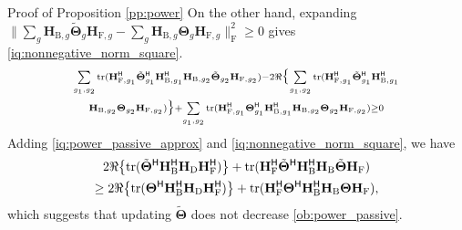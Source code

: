 \begin{appendix}
\begin{subsection}{Proof of Proposition \ref{pp:power}}
On the other hand, expanding $\lVert \sum_g \mathbf{H}_{\mathrm{B},g} \tilde{\mathbf{\Theta}}_g \mathbf{H}_{\mathrm{F},g} - \sum_g \mathbf{H}_{\mathrm{B},g} \mathbf{\Theta}_g \mathbf{H}_{\mathrm{F},g} \rVert _\mathrm{F}^2 \ge 0$ gives \eqref{iq:nonnegative_norm_square}.
\begin{multline}
	\label{iq:nonnegative_norm_square}
	\scriptstyle{\sum\limits_{g_1,g_2} \operatorname{tr}(\mathbf{H}_{\mathrm{F},g_1}^\mathsf{H} \tilde{\mathbf{\Theta}}_{g_1}^\mathsf{H} \mathbf{H}_{\mathrm{B},g_1}^\mathsf{H} \mathbf{H}_{\mathrm{B},g_2} \tilde{\mathbf{\Theta}}_{g_2} \mathbf{H}_{\mathrm{F},g_2}) - 2 \Re \bigl\{\sum\limits_{g_1,g_2} \operatorname{tr}(\mathbf{H}_{\mathrm{F},g_1}^\mathsf{H} \tilde{\mathbf{\Theta}}_{g_1}^\mathsf{H} \mathbf{H}_{\mathrm{B},g_1}^\mathsf{H} }\\
		\scriptstyle{\mathbf{H}_{\mathrm{B},g_2} \mathbf{\Theta}_{g_2} \mathbf{H}_{\mathrm{F},g_2})\bigr\} + \sum\limits_{g_1,g_2} \operatorname{tr}(\mathbf{H}_{\mathrm{F},g_1}^\mathsf{H} {\mathbf{\Theta}}_{g_1}^\mathsf{H} \mathbf{H}_{\mathrm{B},g_1}^\mathsf{H} \mathbf{H}_{\mathrm{B},g_2} {\mathbf{\Theta}}_{g_2} \mathbf{H}_{\mathrm{F},g_2}) \ge 0}
\end{multline}
Adding \eqref{iq:power_passive_approx} and \eqref{iq:nonnegative_norm_square}, we have
\begin{multline}
	2 \Re \bigl\{\operatorname{tr}(\tilde{\mathbf{\Theta}}^\mathsf{H} \mathbf{H}_\mathrm{B}^\mathsf{H} \mathbf{H}_\mathrm{D} \mathbf{H}_\mathrm{F}^\mathsf{H}) \bigr\} + \operatorname{tr}(\mathbf{H}_\mathrm{F}^\mathsf{H} \tilde{\mathbf{\Theta}}^\mathsf{H} \mathbf{H}_\mathrm{B}^\mathsf{H} \mathbf{H}_\mathrm{B} \tilde{\mathbf{\Theta}} \mathbf{H}_\mathrm{F}) \\
	\ge 2 \Re \bigl\{\operatorname{tr}({\mathbf{\Theta}}^\mathsf{H} \mathbf{H}_\mathrm{B}^\mathsf{H} \mathbf{H}_\mathrm{D} \mathbf{H}_\mathrm{F}^\mathsf{H}) \bigr\} + \operatorname{tr}(\mathbf{H}_\mathrm{F}^\mathsf{H} {\mathbf{\Theta}}^\mathsf{H} \mathbf{H}_\mathrm{B}^\mathsf{H} \mathbf{H}_\mathrm{B} {\mathbf{\Theta}} \mathbf{H}_\mathrm{F}),
\end{multline}
which suggests that updating $\tilde{\mathbf{\Theta}}$ does not decrease \eqref{ob:power_passive}.

\end{subsection}
\end{appendix}
